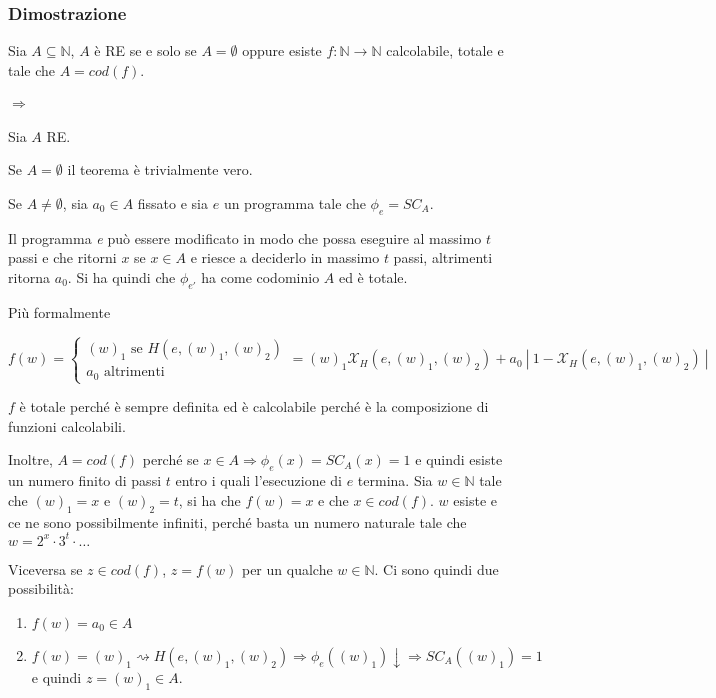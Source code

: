 \subsubsection{Dimostrazione}

Sia $A \subseteq \mathbb{N}$, $A$ è RE se e solo se $A = \emptyset $ oppure esiste $f : \mathbb{N} \rightarrow \mathbb{N}$ calcolabile, totale e tale che $A = cod(f)$.

\paragraph{$\Rightarrow$}

Sia $A$ RE.

Se $A = \emptyset$ il teorema è trivialmente vero.

Se $A \neq \emptyset$, sia $a_0 \in A$ fissato e sia $e$ un programma tale che $\phi_e = SC_A$.

Il programma \textit{e} può essere modificato in modo che possa eseguire al massimo $t$ passi e che ritorni $x$ se $x \in A$ e riesce a deciderlo in massimo $t$ passi, altrimenti ritorna $a_0$. Si ha quindi che $\phi_{e'}$ ha come codominio $A$ ed è totale.

Più formalmente

$$
f(w) = \begin{cases}
(w)_1 \text{ se } H(e, (w)_1, (w)_2) \\
a_0 \text{ altrimenti}
\end{cases} = (w)_1 \mathcal{X}_H(e, (w)_1, (w)_2) + a_0 \: | \:1 - \mathcal{X}_H(e, (w)_1, (w)_2)\:|
$$ 

$f$ è totale perché è sempre definita ed è calcolabile perché è la composizione di funzioni calcolabili.

Inoltre, $A = cod(f)$ perché se $x \in A \Rightarrow \phi_e(x) = SC_A(x) = 1$ e quindi esiste un numero finito di passi $t$ entro i quali l'esecuzione di $e$ termina. Sia $w \in \mathbb{N}$ tale che $(w)_1 = x$ e $(w)_2 = t$, si ha che $f(w) = x$ e che $x \in cod(f)$.
$w$ esiste e ce ne sono possibilmente infiniti, perché basta un numero naturale tale che $w = 2^x \cdot 3^t \cdot \ldots $

Viceversa se $z \in cod(f)$, $z = f(w)$ per un qualche $w \in \mathbb{N}$. Ci sono quindi due possibilità:

\begin{enumerate}
	\item $f(w) = a_0 \in A$
	\item $f(w) = (w)_1 \rightsquigarrow H(e, (w)_1, (w)_2) \Rightarrow \phi_e((w)_1) \downarrow \Rightarrow SC_A((w)_1) = 1$ e quindi $z = (w)_1 \in A$.
\end{enumerate}


